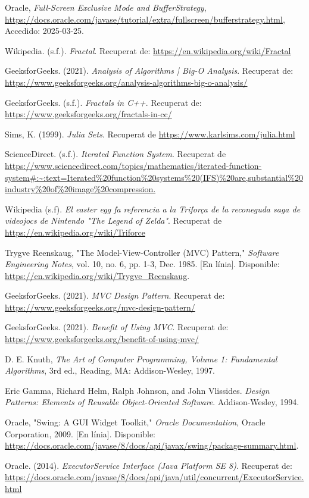 \documentclass{ieeetj}
\begin{document}
\begin{thebibliography}{9}

Oracle, \textit{Full-Screen Exclusive Mode and BufferStrategy}, \url{https://docs.oracle.com/javase/tutorial/extra/fullscreen/bufferstrategy.html}, Accedido: 2025-03-25.

Wikipedia. (s.f.). \textit{Fractal}. Recuperat de: \url{https://en.wikipedia.org/wiki/Fractal}


GeeksforGeeks. (2021). \textit{Analysis of Algorithms | Big-O Analysis}. Recuperat de: \url{https://www.geeksforgeeks.org/analysis-algorithms-big-o-analysis/}

GeeksforGeeks. (s.f.). \textit{Fractals in C++}. Recuperat de: \url{https://www.geeksforgeeks.org/fractals-in-cc/}

 Sims, K. (1999). \textit{Julia Sets}. Recuperat de \url{https://www.karlsims.com/julia.html}

 ScienceDirect. (s.f.). \textit{Iterated Function System}. Recuperat de \url{https://www.sciencedirect.com/topics/mathematics/iterated-function-system#:~:text=Iterated%20function%20systems%20(IFS)%20are,substantial%20industry%20of%20image%20compression.}

 Wikipedia (s.f). \textit{El easter egg fa referencia a la Triforça de la reconeguda saga de videojocs de Nintendo "The Legend of Zelda"}. Recuperat de \url{https://en.wikipedia.org/wiki/Triforce}

Trygve Reenskaug, "The Model-View-Controller (MVC) Pattern," \textit{Software Engineering Notes}, vol. 10, no. 6, pp. 1-3, Dec. 1985. [En línia]. Disponible: \url{https://en.wikipedia.org/wiki/Trygve_Reenskaug}.

GeeksforGeeks. (2021). \textit{MVC Design Pattern}. Recuperat de: \url{https://www.geeksforgeeks.org/mvc-design-pattern/}

GeeksforGeeks. (2021). \textit{Benefit of Using MVC}. Recuperat de: \url{https://www.geeksforgeeks.org/benefit-of-using-mvc/}

D. E. Knuth, \textit{The Art of Computer Programming, Volume 1: Fundamental Algorithms}, 3rd ed., Reading, MA: Addison-Wesley, 1997.

Eric Gamma, Richard Helm, Ralph Johnson, and John Vlissides. \emph{Design Patterns: Elements of Reusable Object-Oriented Software}. Addison-Wesley, 1994.

Oracle, "Swing: A GUI Widget Toolkit," \textit{Oracle Documentation}, Oracle Corporation, 2009. [En línia]. Disponible: \url{https://docs.oracle.com/javase/8/docs/api/javax/swing/package-summary.html}.

Oracle. (2014). \textit{ExecutorService Interface (Java Platform SE 8)}. Recuperat de: \url{https://docs.oracle.com/javase/8/docs/api/java/util/concurrent/ExecutorService.html}

\end{thebibliography}
\end{document}
